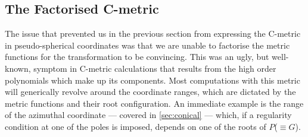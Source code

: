 \documentclass[
twoside,
openright,
frontopenright
]{dmathesis}
\begin{document}
\subsection{The Factorised C-metric}
\label{sec:factorised}

The issue that prevented us in the previous section from expressing the C-metric
in pseudo-spherical coordinates was that we are unable to factorise the metric
functions for the transformation to be convincing. This was an ugly, but
well-known, symptom in C-metric calculations that results from the high order
polynomials which make up its components. Most computations with this metric
will generically revolve around the coordinate ranges, which are dictated by the
metric functions and their root configuration. An immediate example is the range
of the azimuthal coordinate --- covered in \cref{sec:conical} --- which, if a
regularity condition at one of the poles is imposed, depends on one of the roots
of $P$($\equiv G$).
\end{document}
